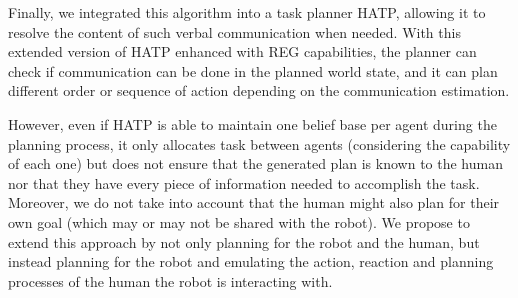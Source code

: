 \documentclass[a4paper,11pt,twoside]{StyleThese}
\begin{document}
Finally, we integrated this algorithm into a task planner HATP, allowing it to resolve the content of such verbal communication when needed. With this extended version of HATP enhanced with REG capabilities, the planner can check if communication can be done in the planned world state, and it can plan different order or sequence of action depending on the communication estimation.

However, even if HATP is able to maintain one belief base per agent during the planning process, it only allocates task between agents (considering the capability of each one) but does not ensure that the generated plan is known to the human nor that they have every piece of information needed to accomplish the task. Moreover, we do not take into account that the human might also plan for their own goal (which may or may not be shared with the robot). 
We propose to extend this approach by not only planning for the robot and the human, but instead planning for the robot and emulating the action, reaction and planning processes of the human the robot is interacting with.

\ifdefined{}
\else


\end{document}
